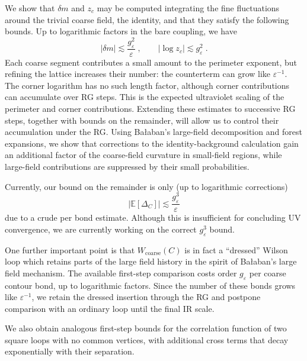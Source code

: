 \documentclass[10pt,a4paper]{article}
\newcommand{\subhead}[1]{\par\vspace{5pt}{\large\bfseries\color{ink}#1\par}\vspace{3pt}}
\begin{document}
We show that $\delta m$ and $z_c$ may be computed integrating the fine fluctuations around the trivial coarse field, the identity, and that they satisfy the following bounds. Up to logarithmic factors in the bare coupling, we have
\begin{equation*}
    |\delta m|\lesssim  \frac{g_\varepsilon^2}{\varepsilon}\;,\qquad |\log z_c| \lesssim g_\varepsilon^2\;.
\end{equation*}
Each coarse segment contributes a small amount to the perimeter exponent, but refining the lattice increases their number: the counterterm can grow like $\varepsilon^{-1}$. The corner logarithm has no such length factor, although corner contributions can accumulate over RG steps. This is the expected ultraviolet scaling of the perimeter and corner contributions. Extending these estimates to successive RG steps, together with bounds on the remainder, will allow us to control their accumulation under the RG. Using Ba{\l}aban's large-field decomposition and forest expansions, we show that corrections to the identity-background calculation gain an additional factor of the coarse-field curvature in small-field regions, while large-field contributions are suppressed by their small probabilities. 

Currently, our bound on the remainder is only (up to logarithmic corrections)
\begin{equation*}
    \left|\mathbb E[\Delta_C]\right| \lesssim \frac{g_\varepsilon^3}{\varepsilon}    
\end{equation*}
due to a crude per bond estimate. Although this is insufficient for concluding UV convergence, we are currently working on the correct $g_\varepsilon^3$ bound.

One further important point is that $W_{\mathrm{coarse}}(C)$ is in fact a ``dressed'' Wilson loop which retains parts of the large field history in the spirit of Ba{\l}aban's large field mechanism. The available first-step comparison costs order $g_\varepsilon$ per coarse contour bond, up to logarithmic factors. Since the number of these bonds grows like $\varepsilon^{-1}$, we retain the dressed insertion through the RG and postpone comparison with an ordinary loop until the final IR scale.

We also obtain analogous first-step bounds for the correlation function of two square loops with no common vertices, with additional cross terms that decay exponentially with their separation.

\subhead{The Programme for Iteration}
\end{document}
